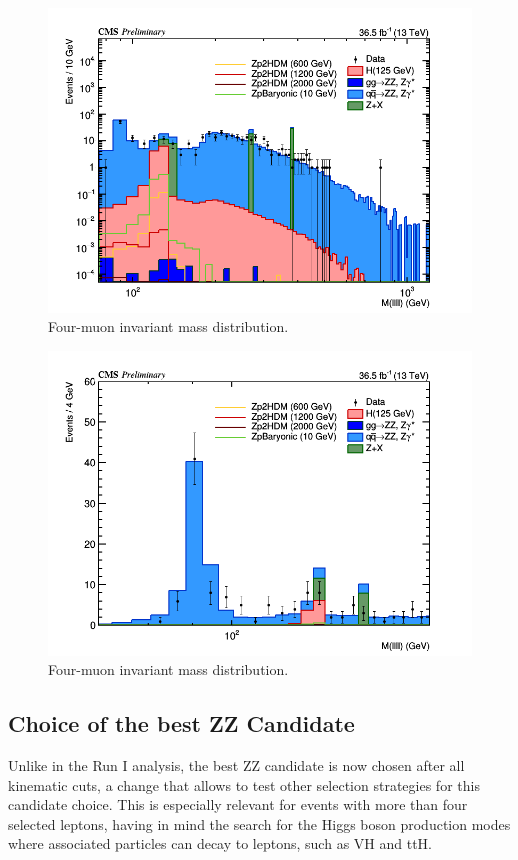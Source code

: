 \begin{figure}[tbh]
\centering
\includegraphics[width=5in]{figures/hist_hM4l_8_log.png}
    \caption{Four-muon invariant mass distribution.}
    \label{fig:m4mulog}
\end{figure}

\begin{figure}[tbh]
\centering
\includegraphics[width=5in]{figures/hist_hM4l_8_linear.png}
    \caption{Four-muon invariant mass distribution.}
    \label{fig:m4mulin}
\end{figure}

\subsection{Choice of the best ZZ Candidate}
\label{sec:zzbestcand}

Unlike in the Run I analysis, the best ZZ candidate is now chosen after all kinematic cuts, a change that allows to test other selection strategies for this candidate choice. 
This is especially relevant for events with more than four selected leptons, having in mind the search for the Higgs boson production modes where associated particles can decay to leptons, such as VH and ttH.

